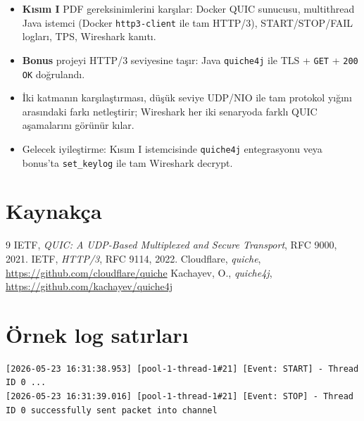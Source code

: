 \documentclass[12pt,a4paper]{article}
\begin{document}
\begin{itemize}[leftmargin=1.5em]
  \item \textbf{Kısım I} PDF gereksinimlerini karşılar: Docker QUIC sunucusu,
        multithread Java istemci (Docker \texttt{http3-client} ile tam HTTP/3),
        START/STOP/FAIL logları, TPS, Wireshark kanıtı.
  \item \textbf{Bonus} projeyi HTTP/3 seviyesine taşır: Java \texttt{quiche4j}
        ile TLS + \texttt{GET} + \texttt{200 OK} doğrulandı.
  \item İki katmanın karşılaştırması, düşük seviye UDP/NIO ile tam protokol
        yığını arasındaki farkı netleştirir; Wireshark her iki senaryoda
        farklı QUIC aşamalarını görünür kılar.
  \item Gelecek iyileştirme: Kısım I istemcisinde \texttt{quiche4j} entegrasyonu
        veya bonus'ta \texttt{set\_keylog} ile tam Wireshark decrypt.
\end{itemize}

\section*{Kaynakça}

\begin{thebibliography}{9}
  IETF, \textit{QUIC: A UDP-Based Multiplexed and Secure Transport}, RFC 9000, 2021.
  IETF, \textit{HTTP/3}, RFC 9114, 2022.
  Cloudflare, \textit{quiche}, \url{https://github.com/cloudflare/quiche}
  Kachayev, O., \textit{quiche4j}, \url{https://github.com/kachayev/quiche4j}
\end{thebibliography}

\appendix
\section{Örnek log satırları}

\begin{lstlisting}[language={}, caption={quic\_project\_logs.txt}]
[2026-05-23 16:31:38.953] [pool-1-thread-1#21] [Event: START] - Thread ID 0 ...
[2026-05-23 16:31:39.016] [pool-1-thread-1#21] [Event: STOP] - Thread ID 0 successfully sent packet into channel
\end{lstlisting}
\end{document}
